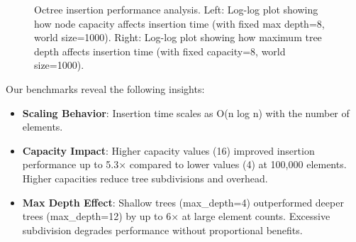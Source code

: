 \documentclass{article}
\begin{document}
\begin{figure}[H]
\begin{minipage}{0.49\textwidth}
    \end{minipage}
    \caption{Octree insertion performance analysis. Left: Log-log plot showing how node capacity affects insertion time (with fixed max depth=8, world size=1000). Right: Log-log plot showing how maximum tree depth affects insertion time (with fixed capacity=8, world size=1000).}
    \label{fig:octree-insertion}
\end{figure}

Our benchmarks reveal the following insights:

\begin{itemize}
    \item \textbf{Scaling Behavior}: Insertion time scales as O(n
	    log n) with the number of elements.
    \item \textbf{Capacity Impact}: Higher capacity values (16) improved
	    insertion performance up to 5.3× compared to lower values (4) at
		100,000 elements. Higher capacities reduce tree subdivisions
		and overhead.
    \item \textbf{Max Depth Effect}: Shallow trees (max\_depth=4) outperformed
	    deeper trees (max\_depth=12) by up to 6× at large element counts.
		Excessive subdivision degrades performance without proportional
		benefits.
\end{itemize}
\end{document}
